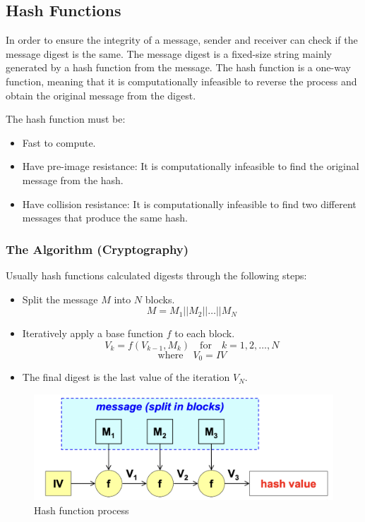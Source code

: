 \subsection{Hash Functions}

In order to ensure the integrity of a message, sender and receiver can check if the message digest is the same. The message digest is a fixed-size string mainly generated by a hash function from the message. The hash function is a one-way function, meaning that it is computationally infeasible to reverse the process and obtain the original message from the digest.

\vspace{0.1cm}

\noindent The hash function must be:
\begin{itemize}
    \item Fast to compute.
    \item Have pre-image resistance: It is computationally infeasible to find the original message from the hash.
    \item Have collision resistance: It is computationally infeasible to find two different messages that produce the same hash.
\end{itemize}

\begin{center}
    \subsubsection*{The Algorithm (Cryptography)}
\end{center}
Usually hash functions calculated digests through the following steps:
\begin{itemize}
    \item Split the message $M$ into $N$ blocks.
    \[
        M = M_1 || M_2 || \dots || M_N
    \]
    \item Iteratively apply a base function $f$ to each block.
    \[
        V_k = f(V_{k-1}, M_k) \quad \text{for} \quad k=1,2,\dots,N
    \]
    \[  
        \text{where} \quad V_0 = IV
    \]
    \item The final digest is the last value of the iteration $V_N$.
\end{itemize}

\begin{figure}[H]
    \centering
    \includegraphics[width=0.5\linewidth]{Images/Cryptography/hash_f.png}
    \caption{Hash function process}
\end{figure}

